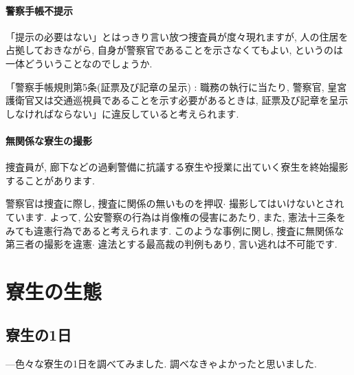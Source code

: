 \documentclass[10pt,b5jsbook,dvips,dvipdfmx,openany]{jsbook}
\theoremstyle{definition}
\begin{document}
			\subsubsection{警察手帳不提示}
			「提示の必要はない」とはっきり言い放つ捜査員が度々現れますが, 人の住居を占拠しておきながら, 自身が警察官であることを示さなくてもよい, というのは一体どういうことなのでしょうか.

			「警察手帳規則第5条(証票及び記章の呈示) : 職務の執行に当たり, 警察官, 皇宮護衛官又は交通巡視員であることを示す必要があるときは, 証票及び記章を呈示しなければならない」に違反していると考えられます.

			\subsubsection{無関係な寮生の撮影}
			捜査員が, 廊下などの過剰警備に抗議する寮生や授業に出ていく寮生を終始撮影することがあります.

			警察官は捜査に際し, 捜査に関係の無いものを押収$ \cdot $ 撮影してはいけないとされています. よって, 公安警察の行為は肖像権の侵害にあたり, また, 憲法十三条をみても違憲行為であると考えられます. このような事例に関し, 捜査に無関係な第三者の撮影を違憲$ \cdot $ 違法とする最高裁の判例もあり, 言い逃れは不可能です.


\chapter{寮生の生態} %


	\section{寮生の1日}
	---色々な寮生の1日を調べてみました. 調べなきゃよかったと思いました.


\end{document}
